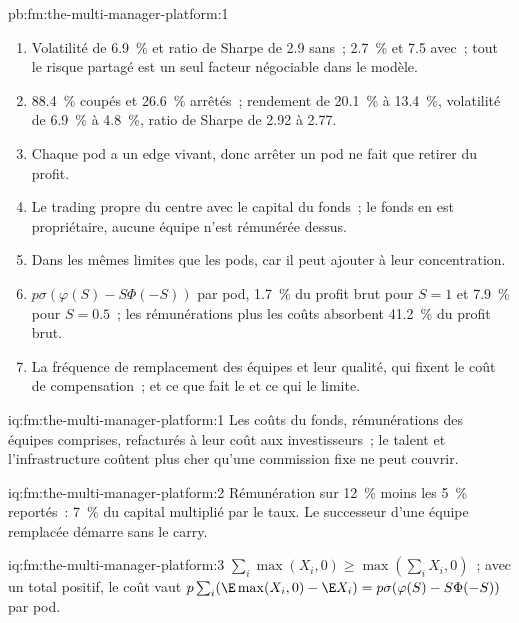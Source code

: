 \begin{solution}{pb:fm:the-multi-manager-platform:1}
\begin{enumerate}
\item Volatilité de 6.9~\% et ratio de Sharpe de 2.9 sans~; 2.7~\% et 7.5 avec~; tout le risque partagé est un seul facteur négociable dans le modèle.
\item 88.4~\% coupés et 26.6~\% arrêtés~; rendement de 20.1~\% à 13.4~\%, volatilité de 6.9~\% à 4.8~\%, ratio de Sharpe de 2.92 à 2.77.
\item Chaque pod a un edge vivant, donc arrêter un pod ne fait que retirer du profit.
\item Le trading propre du centre avec le capital du fonds~; le fonds en est propriétaire, aucune équipe n'est rémunérée dessus.
\item Dans les mêmes limites que les pods, car il peut ajouter à leur concentration.
\item $p\sigma(\varphi(S)-S\Phi(-S))$ par pod, 1.7~\% du profit brut pour $S=1$ et 7.9~\% pour $S=0.5$~; les rémunérations plus les coûts absorbent 41.2~\% du profit brut.
\item La fréquence de remplacement des équipes et leur qualité, qui fixent le coût de compensation~; et ce que fait le  et ce qui le limite.
\end{enumerate}
\end{solution}

\begin{solution}{iq:fm:the-multi-manager-platform:1}
Les coûts du fonds, rémunérations des équipes comprises, refacturés à leur coût aux investisseurs~; le talent et l'infrastructure coûtent plus cher qu'une commission fixe ne peut couvrir.
\end{solution}

\begin{solution}{iq:fm:the-multi-manager-platform:2}
Rémunération sur 12~\% moins les 5~\% reportés~: 7~\% du capital multiplié par le taux. Le successeur d'une équipe remplacée démarre sans le carry.
\end{solution}

\begin{solution}{iq:fm:the-multi-manager-platform:3}
$\sum_i\max(X_i,0)\ge\max(\sum_i X_i,0)$~; avec un total positif, le coût vaut $p\sum_i(\E\max(X_i,0)-\E X_i)=p\sigma(\varphi(S)-S\Phi(-S))$ par pod.
\end{solution}

